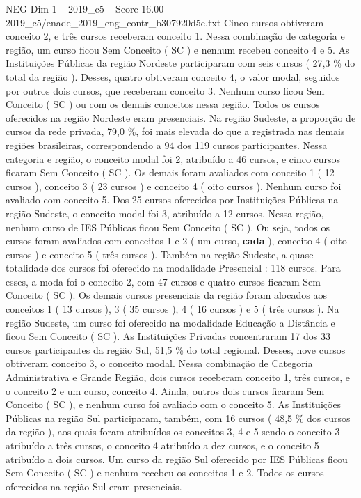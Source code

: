\begin{textsample}{NEG Dim 1 – 2019\_c5 – Score 16.00 – 2019\_c5/enade\_2019\_eng\_contr\_b307920d5e.txt}
Cinco cursos obtiveram conceito 2, e três cursos receberam conceito 1.
Nessa combinação de categoria e região, um curso ficou Sem Conceito ( SC ) e nenhum recebeu conceito 4 e 5.
As Instituições Públicas da região Nordeste participaram com seis cursos ( 27,3 \% do total da região ).
Desses, quatro obtiveram conceito 4, o valor modal, seguidos por outros dois cursos, que receberam conceito 3.
Nenhum curso ficou Sem Conceito ( SC ) ou com os demais conceitos nessa região.
Todos os cursos oferecidos na região Nordeste eram presenciais.
Na região Sudeste, a proporção de cursos da rede privada, 79,0 \%, foi mais elevada do que a registrada nas demais regiões brasileiras, correspondendo a 94 dos 119 cursos participantes.
Nessa categoria e região, o conceito modal foi 2, atribuído a 46 cursos, e cinco cursos ficaram Sem Conceito ( SC ).
Os demais foram avaliados com conceito 1 ( 12 cursos ), conceito 3 ( 23 cursos ) e conceito 4 ( oito cursos ).
Nenhum curso foi avaliado com conceito 5.
Dos 25 cursos oferecidos por Instituições Públicas na região Sudeste, o conceito modal foi 3, atribuído a 12 cursos.
Nessa região, nenhum curso de IES Públicas ficou Sem Conceito ( SC ).
Ou seja, todos os cursos foram avaliados com conceitos 1 e 2 ( um curso, \textbf{cada} ), conceito 4 ( oito cursos ) e conceito 5 ( três cursos ).
Também na região Sudeste, a quase totalidade dos cursos foi oferecido na modalidade Presencial : 118 cursos.
Para esses, a moda foi o conceito 2, com 47 cursos e quatro cursos ficaram Sem Conceito ( SC ).
Os demais cursos presenciais da região foram alocados aos conceitos 1 ( 13 cursos ), 3 ( 35 cursos ), 4 ( 16 cursos ) e 5 ( três cursos ).
Na região Sudeste, um curso foi oferecido na modalidade Educação a Distância e ficou Sem Conceito ( SC ).
As Instituições Privadas concentraram 17 dos 33 cursos participantes da região Sul, 51,5 \% do total regional.
Desses, nove cursos obtiveram conceito 3, o conceito modal.
Nessa combinação de Categoria Administrativa e Grande Região, dois cursos receberam conceito 1, três cursos, e o conceito 2 e um curso, conceito 4.
Ainda, outros dois cursos ficaram Sem Conceito ( SC ), e nenhum curso foi avaliado com o conceito 5.
As Instituições Públicas na região Sul participaram, também, com 16 cursos ( 48,5 \% dos cursos da região ), aos quais foram atribuídos os conceitos 3, 4 e 5 sendo o conceito 3 atribuído a três cursos, o conceito 4 atribuído a dez cursos, e o conceito 5 atribuído a dois cursos.
Um curso da região Sul oferecido por IES Públicas ficou Sem Conceito ( SC ) e nenhum recebeu os conceitos 1 e 2.
Todos os cursos oferecidos na região Sul eram presenciais.

\end{textsample}
